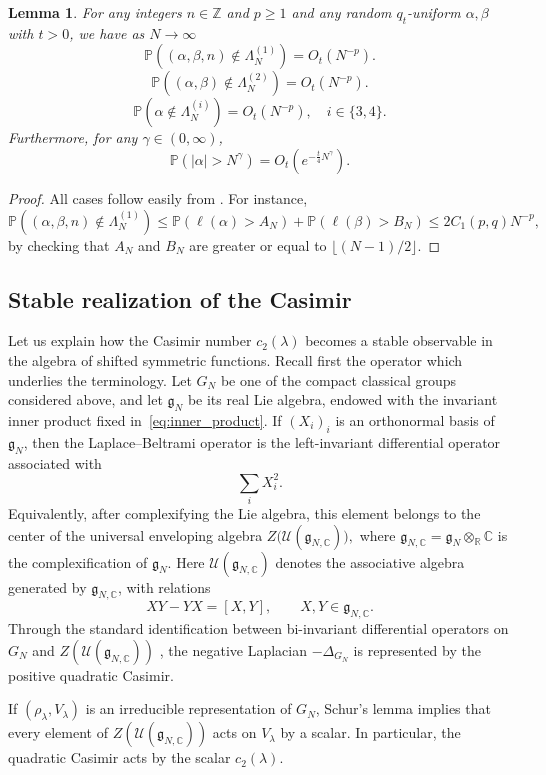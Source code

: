 \documentclass[11pt,a4paper,reqno]{article}
\newtheorem{lemma}[theorem]{Lemma}
\theoremstyle{definition}
\theoremstyle{remark}
\newcommand\Z{{\mathbb Z}}
\newcommand\C{\mathbb{C}}
\newcommand\Pbb{\mathbb{P}}
\begin{document}
\begin{lemma}\label{lem:dev_ineq_bis}
For any integers $n\in\Z$ and $p\geq 1$ and any random $q_t$-uniform $\alpha,\beta$ with $t>0$, we have as $N\to\infty$
\[
\Pbb((\alpha,\beta,n)\notin\Lambda_N^{(1)})=O_t(N^{-p}).
\]
\[
\Pbb((\alpha,\beta)\notin\Lambda_N^{(2)})=O_t(N^{-p}).
\]
\[
\Pbb(\alpha\notin\Lambda_N^{(i)})=O_t(N^{-p}),\quad i\in\{3,4\}.
\]
Furthermore, for any $\gamma\in(0,\infty)$,
\[
\Pbb(\vert\alpha\vert>N^\gamma)=O_t(e^{-\frac{t}{4}N^\gamma}).
\]
\end{lemma}

\begin{proof}
All cases follow easily from \cite[Proposition 2.5]{LM2}. For instance,
\[
\Pbb((\alpha,\beta,n)\notin\Lambda_N^{(1)})\leq \Pbb(\ell(\alpha)>A_N)+\Pbb(\ell(\beta)>B_N)\leq 2 C_1(p,q)N^{-p},
\]
by checking that $A_N$ and $B_N$ are greater or equal to $\lfloor (N-1)/2\rfloor$.
\end{proof}

\subsection{Stable realization of the Casimir}

Let us explain how the Casimir number $c_2(\lambda)$ becomes a stable observable in the algebra of shifted symmetric functions. Recall first the operator which underlies the terminology. Let $G_N$ be one of the compact classical groups considered above, and let $\mathfrak g_N$ be its real Lie algebra, endowed with the invariant inner product fixed in~\eqref{eq:inner_product}. If $(X_i)_i$ is an orthonormal basis of $\mathfrak g_N$, then the Laplace--Beltrami operator is the left-invariant differential operator associated with
\[
        \sum_i X_i^2 .
\]
Equivalently, after complexifying the Lie algebra, this element belongs to the center of the universal enveloping algebra $Z\bigl(\mathcal U(\mathfrak g_{N,\C})\bigr),$ where $\mathfrak g_{N,\C}=\mathfrak g_N\otimes_{\mathbb R}\C$ is the complexification of $\mathfrak{g}_N$. Here $\mathcal U(\mathfrak g_{N,\C})$ denotes the associative algebra generated by $\mathfrak g_{N,\C}$, with relations
\[
        XY-YX=[X,Y],\qquad X,Y\in\mathfrak g_{N,\C}.
\]
Through the standard identification between bi-invariant differential operators on $G_N$ and $Z(\mathcal U(\mathfrak g_{N,\C}))$ \cite[Chap.~10]{FegBook}, the negative Laplacian $-\Delta_{G_N}$ is represented by the positive quadratic Casimir.

If $(\rho_\lambda,V_\lambda)$ is an irreducible representation of $G_N$, Schur's lemma implies that every element of $Z(\mathcal U(\mathfrak g_{N,\C}))$ acts on $V_\lambda$ by a scalar. In particular, the quadratic Casimir acts by the scalar $c_2(\lambda)$.
\end{document}
